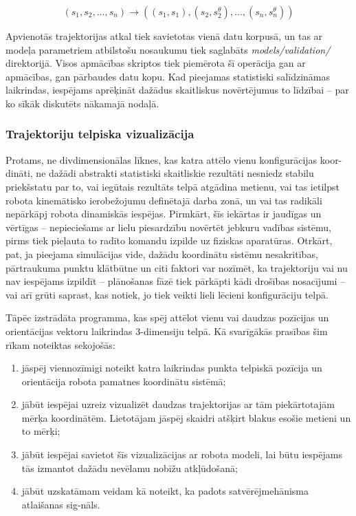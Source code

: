 \documentclass[12pt, a4paper]{article}
\numberwithin{equation}{section} %
\begin{document}
\begin{equation}
    (s_1, s_2, ..., s_n) \rightarrow \left ( (s_1, s_1), (s_2, s^{\theta}_2), ...,      (s_n, s^{\theta}_n) \right )
\end{equation}

Apvienotās trajektorijas atkal tiek savietotas vienā datu korpusā, un tas ar modeļa parametriem atbilstošu nosaukumu tiek saglabāts \textit{models/validation/} direktorijā. Visos apmācības skriptos tiek piemērota šī operācija gan ar apmācības, gan pārbaudes datu kopu. Kad pieejamas statistiski salīdzināmas laikrindas, iespējams aprēķināt dažādus skaitliskus novērtējumus to līdzībai -- par ko sīkāk diskutēts nākamajā nodaļā.

\subsubsection{Trajektoriju telpiska vizualizācija}

Protams, ne divdimensionālas līknes, kas katra attēlo vienu konfigurācijas koor-dināti, ne dažādi abstrakti statistiski skaitliskie rezultāti nesniedz stabilu priekšstatu par to, vai iegūtais rezultāts telpā atgādina metienu, vai tas ietilpst robota kinemātisko ierobežojumu definētajā darba zonā, un vai tas radikāli nepārkāpj robota dinamiskās iespējas. Pirmkārt, šīs iekārtas ir jaudīgas un vērtīgas -- nepieciešams ar lielu piesardzību novērtēt jebkuru vadības sistēmu, pirms tiek pieļauta to radīto komandu izpilde uz fiziskas aparatūras. Otrkārt, pat, ja pieejama simulācijas vide, dažādu koordinātu sistēmu nesakritības, pārtraukuma punktu klātbūtne un citi faktori var nozīmēt, ka trajektoriju vai nu nav iespējams izpildīt -- plānošanas fāzē tiek pārkāpti kādi drošības nosacījumi -- vai arī grūti saprast, kas notiek, jo tiek veikti lieli lēcieni konfigurāciju telpā.

Tāpēc izstrādāta programma, kas spēj attēlot vienu vai daudzas pozīcijas un orientācijas vektoru laikrindas 3-dimensiju telpā. Kā svarīgākās prasības šim rīkam noteiktas sekojošās:

\begin{enumerate}
    \item jāspēj viennozīmigi noteikt katra laikrindas punkta telpiskā pozīcija un orientācija robota pamatnes koordinātu sistēmā;
    \item jābūt iespējai uzreiz vizualizēt daudzas trajektorijas ar tām piekārtotajām mērķa koordinātēm. Lietotājam jāspēj skaidri atšķirt blakus esošie metieni un to mērķi;
    \item jābūt iespējai savietot šīs vizualizācijas ar robota modeli, lai būtu iespējams tās izmantot dažādu nevēlamu nobīžu atkļūdošanā;
    \item jābūt uzskatāmam veidam kā noteikt, ka padots satvērējmehānisma atlaišanas sig-nāls.
\end{enumerate}
\end{document}
